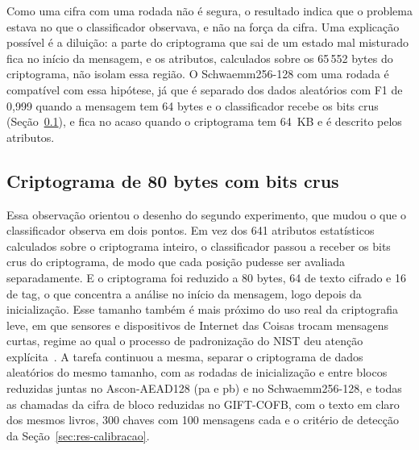 Como uma cifra com uma rodada não é segura, o resultado indica que o problema estava no que o classificador observava, e não na força da cifra. Uma explicação possível é a diluição: a parte do criptograma que sai de um estado mal misturado fica no início da mensagem, e os atributos, calculados sobre os 65\,552 bytes do criptograma, não isolam essa região. O Schwaemm256-128 com uma rodada é compatível com essa hipótese, já que é separado dos dados aleatórios com F1 de 0,999 quando a mensagem tem 64 bytes e o classificador recebe os bits crus (Seção~\ref{sec:res-isolado-80b}), e fica no acaso quando o criptograma tem 64~KB e é descrito pelos atributos.

\subsection{Criptograma de 80 bytes com bits crus}
\label{sec:res-isolado-80b}

Essa observação orientou o desenho do segundo experimento, que mudou o que o classificador observa em dois pontos. Em vez dos 641 atributos estatísticos calculados sobre o criptograma inteiro, o classificador passou a receber os bits crus do criptograma, de modo que cada posição pudesse ser avaliada separadamente. E o criptograma foi reduzido a 80 bytes, 64 de texto cifrado e 16 de tag, o que concentra a análise no início da mensagem, logo depois da inicialização. Esse tamanho também é mais próximo do uso real da criptografia leve, em que sensores e dispositivos de Internet das Coisas trocam mensagens curtas, regime ao qual o processo de padronização do NIST deu atenção explícita~\cite{NIST2018LWCRequirements,IEEE802154_2020}. A tarefa continuou a mesma, separar o criptograma de dados aleatórios do mesmo tamanho, com as rodadas de inicialização e entre blocos reduzidas juntas no Ascon-AEAD128 (pa e pb) e no Schwaemm256-128, e todas as chamadas da cifra de bloco reduzidas no GIFT-COFB, com o texto em claro dos mesmos livros, 300 chaves com 100 mensagens cada e o critério de detecção da Seção~\ref{sec:res-calibracao}.

